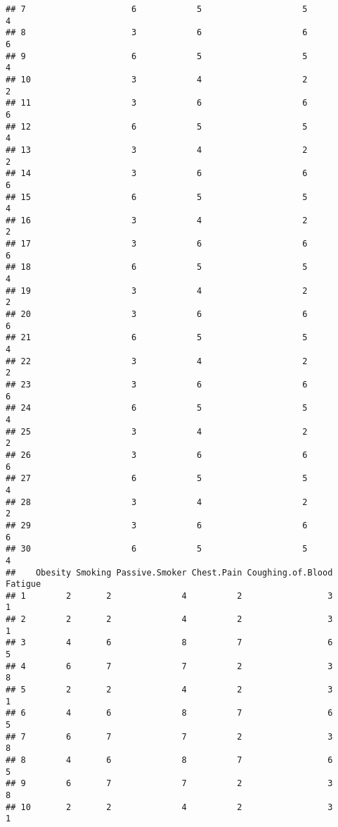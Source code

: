 \documentclass[]{article}
\begin{document}
\begin{verbatim}
## 7                     6            5                    5             4
## 8                     3            6                    6             6
## 9                     6            5                    5             4
## 10                    3            4                    2             2
## 11                    3            6                    6             6
## 12                    6            5                    5             4
## 13                    3            4                    2             2
## 14                    3            6                    6             6
## 15                    6            5                    5             4
## 16                    3            4                    2             2
## 17                    3            6                    6             6
## 18                    6            5                    5             4
## 19                    3            4                    2             2
## 20                    3            6                    6             6
## 21                    6            5                    5             4
## 22                    3            4                    2             2
## 23                    3            6                    6             6
## 24                    6            5                    5             4
## 25                    3            4                    2             2
## 26                    3            6                    6             6
## 27                    6            5                    5             4
## 28                    3            4                    2             2
## 29                    3            6                    6             6
## 30                    6            5                    5             4
##    Obesity Smoking Passive.Smoker Chest.Pain Coughing.of.Blood Fatigue
## 1        2       2              4          2                 3       1
## 2        2       2              4          2                 3       1
## 3        4       6              8          7                 6       5
## 4        6       7              7          2                 3       8
## 5        2       2              4          2                 3       1
## 6        4       6              8          7                 6       5
## 7        6       7              7          2                 3       8
## 8        4       6              8          7                 6       5
## 9        6       7              7          2                 3       8
## 10       2       2              4          2                 3       1

\end{verbatim}
\end{document}
